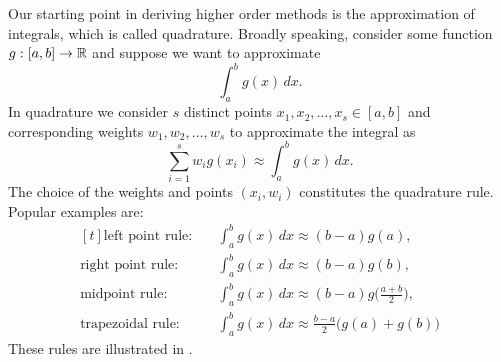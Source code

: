 Our starting point in deriving higher order methods is 
the approximation of integrals, which is called 
quadrature. Broadly speaking, consider some function 
$g:[a, b] \to \mathbb{R}$ and suppose we want to approximate 
\begin{equation*}
    \int_a^b g(x) \, dx.
\end{equation*}
In quadrature we consider $s$ distinct points $x_1, x_2, \dots, x_s \in [a, b]$ and corresponding weights $w_1, w_2, \dots, w_s$ to approximate the integral as
\begin{equation*}
    \sum_{i=1}^s w_i g(x_i) \approx \int_{a}^{b} g(x) \, dx.
\end{equation*}
The choice of the weights and points $(x_i, w_i)$ constitutes 
the quadrature rule. Popular examples are: 
\begin{equation*}
    \begin{aligned}[t]
        \text{left point rule:} & \quad \int_a^b g(x) \, dx \approx (b-a) g(a), \\
        \text{right point rule:} & \quad \int_a^b g(x) \, dx \approx (b-a) g(b), \\
        \text{midpoint rule:} & \quad \int_a^b g(x) \, dx \approx (b-a) g\Big(\frac{a+b}{2}\Big), \\
        \text{trapezoidal rule:} & \quad \int_a^b g(x) \, dx \approx \frac{b-a}{2} \Big(g(a) + g(b)\Big)
    \end{aligned}
\end{equation*}
These rules are illustrated in .

